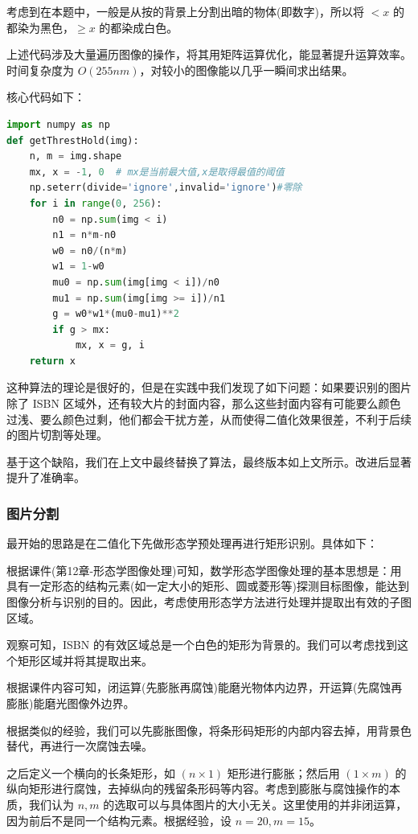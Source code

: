 \documentclass{ctexart}
\begin{document}
考虑到在本题中，一般是从按的背景上分割出暗的物体(即数字)，所以将 $< x$ 的都染为黑色，$\ge x$ 的都染成白色。

上述代码涉及大量遍历图像的操作，将其用矩阵运算优化，能显著提升运算效率。时间复杂度为 $O(255nm)$，对较小的图像能以几乎一瞬间求出结果。

核心代码如下：
\begin{lstlisting}[language=python]
import numpy as np
def getThrestHold(img):
    n, m = img.shape
    mx, x = -1, 0  # mx是当前最大值,x是取得最值的阈值
    np.seterr(divide='ignore',invalid='ignore')#零除
    for i in range(0, 256):
        n0 = np.sum(img < i)
        n1 = n*m-n0
        w0 = n0/(n*m)
        w1 = 1-w0
        mu0 = np.sum(img[img < i])/n0
        mu1 = np.sum(img[img >= i])/n1
        g = w0*w1*(mu0-mu1)**2
        if g > mx:
            mx, x = g, i
    return x
\end{lstlisting}

这种算法的理论是很好的，但是在实践中我们发现了如下问题：如果要识别的图片除了 ISBN 区域外，还有较大片的封面内容，那么这些封面内容有可能要么颜色过浅、要么颜色过剩，他们都会干扰方差，从而使得二值化效果很差，不利于后续的图片切割等处理。

基于这个缺陷，我们在上文中最终替换了算法，最终版本如上文所示。改进后显著提升了准确率。

\subsubsection{图片分割}
最开始的思路是在二值化下先做形态学预处理再进行矩形识别。具体如下：

根据课件(第12章-形态学图像处理)可知，数学形态学图像处理的基本思想是：用具有一定形态的结构元素(如一定大小的矩形、圆或菱形等)探测目标图像，能达到图像分析与识别的目的。因此，考虑使用形态学方法进行处理并提取出有效的子图区域。

观察可知，ISBN 的有效区域总是一个白色的矩形为背景的。我们可以考虑找到这个矩形区域并将其提取出来。

根据课件内容可知，闭运算(先膨胀再腐蚀)能磨光物体内边界，开运算(先腐蚀再膨胀)能磨光图像外边界。

根据类似的经验，我们可以先膨胀图像，将条形码矩形的内部内容去掉，用背景色替代，再进行一次腐蚀去噪。

之后定义一个横向的长条矩形，如 $(n\times 1)$ 矩形进行膨胀；然后用 $(1\times m)$ 的纵向矩形进行腐蚀，去掉纵向的残留条形码等内容。考虑到膨胀与腐蚀操作的本质，我们认为 $n,m$ 的选取可以与具体图片的大小无关。这里使用的并非闭运算，因为前后不是同一个结构元素。根据经验，设 $n=20,m=15$。
\end{document}
